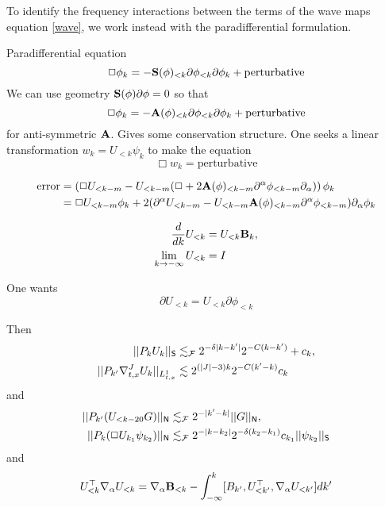 To identify the frequency interactions between the terms of the wave maps equation \eqref{wave}, we work instead with the paradifferential formulation. 

Paradifferential equation 
	\[
		\Box \phi_k = - {\bf S}(\phi)_{< k} \partial \phi_{< k} \partial \phi_k + \text{perturbative}
	\]
We can use geometry ${\bf S}(\phi) \partial \phi = 0$ so that 	
	\[
		\Box \phi_k = - {\bf A}(\phi)_{< k} \partial \phi_{< k} \partial \phi_k + \text{perturbative}
	\]
for anti-symmetric ${\bf A}$. Gives some conservation structure. One seeks a linear transformation $w_k = U_{< k} \psi_k$ to make the equation 
	\[
		\Box w_k = \text{perturbative} 
	\]
	
	\begin{align*}
		\text{error}
			&=	\left(\Box U_{< k - m} - U_{< k - m} (\Box + 2 {\bf A} (\phi)_{< k - m} \partial^\alpha \phi_{< k - m} \partial_\alpha) \right) \phi_k\\
			&= \Box U_{< k - m} \phi_k + 2(\partial^\alpha U_{< k - m} - U_{< k - m} {\bf A} (\phi)_{< k - m} \partial^\alpha \phi_{< k - m}) \partial_\alpha \phi_k
	\end{align*}
		
	\begin{equation}
		\begin{split}
			\frac{d}{dk} U_{< k}
				&= U_{< k} {\bf B}_k, \\
			\lim_{k \to - \infty} U_{< k}
				&= I
		\end{split}
		\label{eq:ODE}
	\end{equation}	
	
One wants 
	\[
		\partial U_{< k} = U_{< k} \partial \phi_{< k}
	\]	

\begin{lemma}
	Then 
		\begin{align*}
			||P_k U_k||_{\mathsf S}
				&\lesssim_\mathcal F 2^{-\delta |k - k'|} 2^{-C ( k - k')} + c_k, \\
			||P_{k'} \nabla^J_{t, x} U_k||_{L^1_{t,x}}
				&\lesssim 2^{(|J| - 3)k} 2^{-C(k' - k)} c_k		
		\end{align*}
	and
		\begin{align}
			||P_{k'} (U_{< k - 20} G) ||_{\mathsf N}
				&\lesssim_\mathcal F 2^{-|k' - k|} ||G||_{\mathsf N}, \\
			||P_k (\Box U_{k_1} \psi_{k_2}) ||_{\mathsf N}
				&\lesssim_\mathcal F 2^{-|k - k_2|} 2^{-\delta(k_2 - k_1)} c_{k_1} ||\psi_{k_2}||_{\mathsf S}	
		\end{align}	
	and
		\begin{equation}
			U_{< k}^\top \nabla_\alpha U_{< k} = \nabla_\alpha {\bf B}_{< k} - \int_{-\infty}^k [B_{k'}, U^\top_{< k'} , \nabla_\alpha U_{< k'}] dk'
		\end{equation}
\end{lemma}	
	
